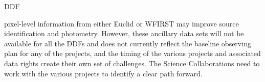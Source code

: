 {\begin{tasklist}{DDF}
\begin{task}
{pixel-level information from either Euclid or WFIRST
may improve source identification and photometry.
However, these ancillary data sets will not be available for all the DDFs and does not currently
reflect the baseline observing plan for any of the projects, and the timing of the various projects and associated data rights create their own set of challenges. The Science Collaborations need to work with the various projects to identify a clear path forward.}
~\\
\end{task}

\end{tasklist}

}
